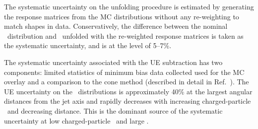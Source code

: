 The systematic uncertainty on the unfolding procedure is estimated by generating the response matrices from the MC distributions without any re-weighting to match shapes in data. Conservatively, the difference between the nominal \Dptr\ distribution and \Dptr\ unfolded with the re-weighted response matrices is taken as the systematic uncertainty, and is at the level of 5--7\%.

The systematic uncertainty associated with the UE subtraction has two components: limited statistics of minimum bias data collected used for the MC overlay and a comparison to the cone method (described in detail in Ref.~\cite{Aaboud:2017bzv}). 
The UE uncertainty on the \Dptr\ distributions is approximately 40\% at the largest angular distances from the jet axis and rapidly decreases with increasing charged-particle \pT\ and decreasing distance. This is the dominant source of the systematic uncertainty at low charged-particle \pt\ and large \rvar.



